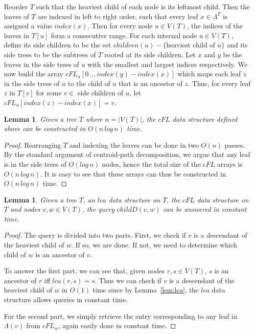 \documentclass[final,1p,times]{elsarticle}
\newcommand{\leafset}{\Lambda}
\newtheorem{lemma}[theorem]{Lemma}
\begin{document}
    Reorder $T$ such that the heaviest child of each node is its leftmost child. Then the leaves of $T$ are indexed in left to right order, such that every leaf $x \in \leafset^T$ is assigned a value $index(x)$. Then for every node $u \in V(T)$, the indices of the leaves in $T[u]$ form a consecutive range. For each internal node $u \in V(T)$, define its side children to be the set $children(u) - \{\text{heaviest child of }u\}$ and its side trees to be the subtrees of $T$ rooted at its side children. Let $x$ and $y$ be the leaves in the side trees of $u$ with the smallest and largest indices respectively. We now build the array $cFL_u[0\, \ldots\, index(y) - index(x)]$ which maps each leaf $z$ in the side trees of $u$ to the child of $u$ that is an ancestor of $z$. Thus, for every leaf $z$ in $T[v]$ for some $v \in$ side children of $u$, let $cFL_u[index(z) - index(x)] = v$.
    \newline

    \begin{lemma}
        \label{lem:cfddatastructure}
        Given a tree $T$ where $n = |V(T)|$, the $cFL$ data structure defined above can be constructed in $O(n\,log\,n)$ time.
    \end{lemma}
        \begin{proof}
            Rearranging $T$ and indexing the leaves can be done in two $O(n)$ passes. By the standard argument of centroid-path decomposition, we argue that any leaf is in the side trees of $O(log\,n)$ nodes, hence the total size of the $cFL$ arrays is $O(n\,log\,n)$. It is easy to see that these arrays can thus be constructed in $O(n\,log\,n)$ time.
        \end{proof}

    \medskip
    \begin{lemma}
        \label{lem:cfdquery}
        Given a tree $T$, an $lca$ data structure on $T$, the $cFL$ data structure on $T$ and nodes $v, w \in V(T)$, the query $childD(v, w)$ can be answered in constant time.
    \end{lemma}
        \begin{proof}
            The query is divided into two parts. First, we check if $v$ is a descendant of the heaviest child of $w$. If so, we are done. If not, we need to determine which child of $w$ is an ancestor of $v$.

            To answer the first part, we can see that, given nodes $r, s \in V(T)$, $s$ is an ancestor of $r$ iff $lca(r, s) = s$. Thus we can check if $v$ is a descendant of the heaviest child of $w$ in $O(1)$ time since by Lemma~\ref{lem:lca}, the $lca$ data structure allows queries in constant time.

            For the second part, we simply retrieve the entry corresponding to any leaf in $\leafset(v)$ from $cFL_w$, again easily done in constant time.
        \end{proof}
\end{document}
